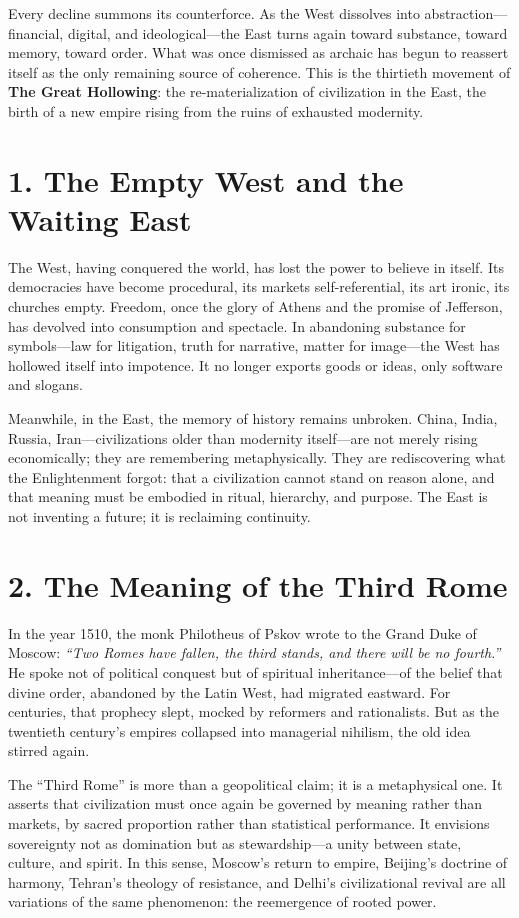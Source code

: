 \documentclass[11pt,twoside]{book}
\begin{document}
Every decline summons its counterforce.  
As the West dissolves into abstraction—financial, digital, and ideological—the East turns again toward substance, toward memory, toward order.  
What was once dismissed as archaic has begun to reassert itself as the only remaining source of coherence.  
This is the thirtieth movement of \textbf{The Great Hollowing}: the re-materialization of civilization in the East, the birth of a new empire rising from the ruins of exhausted modernity.

\section*{1. The Empty West and the Waiting East}

The West, having conquered the world, has lost the power to believe in itself.  
Its democracies have become procedural, its markets self-referential, its art ironic, its churches empty.  
Freedom, once the glory of Athens and the promise of Jefferson, has devolved into consumption and spectacle.  
In abandoning substance for symbols—law for litigation, truth for narrative, matter for image—the West has hollowed itself into impotence.  
It no longer exports goods or ideas, only software and slogans.

Meanwhile, in the East, the memory of history remains unbroken.  
China, India, Russia, Iran—civilizations older than modernity itself—are not merely rising economically; they are remembering metaphysically.  
They are rediscovering what the Enlightenment forgot: that a civilization cannot stand on reason alone, and that meaning must be embodied in ritual, hierarchy, and purpose.  
The East is not inventing a future; it is reclaiming continuity.

\section*{2. The Meaning of the Third Rome}

In the year 1510, the monk Philotheus of Pskov wrote to the Grand Duke of Moscow:  
\textit{“Two Romes have fallen, the third stands, and there will be no fourth.”}  
He spoke not of political conquest but of spiritual inheritance—of the belief that divine order, abandoned by the Latin West, had migrated eastward.  
For centuries, that prophecy slept, mocked by reformers and rationalists.  
But as the twentieth century’s empires collapsed into managerial nihilism, the old idea stirred again.

The “Third Rome” is more than a geopolitical claim; it is a metaphysical one.  
It asserts that civilization must once again be governed by meaning rather than markets, by sacred proportion rather than statistical performance.  
It envisions sovereignty not as domination but as stewardship—a unity between state, culture, and spirit.  
In this sense, Moscow’s return to empire, Beijing’s doctrine of harmony, Tehran’s theology of resistance, and Delhi’s civilizational revival are all variations of the same phenomenon: the reemergence of rooted power.
\end{document}
